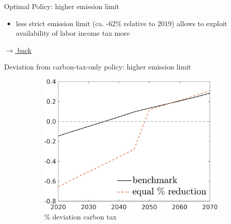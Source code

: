 \documentclass[11pt,aspectratio=169]{beamer}
\begin{document}
\begin{frame}{Optimal Policy: higher emission limit}
\begin{figure}[h!!]
\end{figure}
\vspace{5mm}
\begin{block}{}
	\begin{itemize}
		\item less strict emission limit (ca. -62\% relative to 2019) allows to exploit availability of labor income tax more
	\end{itemize}
\end{block}	

\vspace{-2mm}
\hfill
\hyperlink{backOPT}{\tiny{$\rightarrow$ back}}\textbf{}
\end{frame}



\begin{frame}{Deviation from carbon-tax-only policy: higher emission limit}
\hypertarget{altemsdecomp}{}
\vspace{-3mm}
\centering
\begin{figure}
	\begin{subfigure}{0.42\textwidth}
		\caption{{\% deviation carbon tax}}
		\includegraphics[width=1\textwidth]{../codding_model/own_basedOnFried/optimalPol_010922_revision/figures/all_13Sept22/EmsDecomp_CTO_Sens_Tauf_spillover0_knspil0_xgr0_nsk0_sep0_extern0_PV1_etaa0.79_lgd1.png}
	\end{subfigure}
	\begin{minipage}[]{0.1\textwidth}
		\
	\end{minipage}
	\begin{subfigure}{0.4\textwidth}

\end{subfigure}
\end{figure}
\end{frame}
\end{document}
